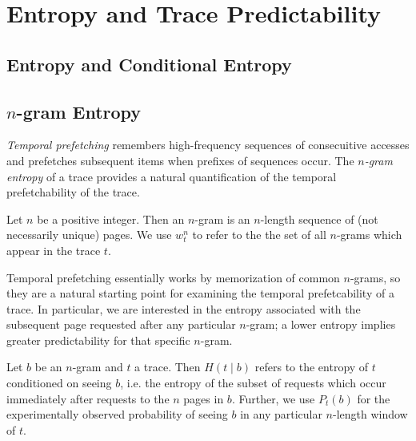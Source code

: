 \section{Entropy and Trace Predictability}

\subsection{Entropy and Conditional Entropy}


\subsection{$n$-gram Entropy}

\textit{Temporal prefetching} remembers high-frequency sequences of
consecuitive accesses and prefetches subsequent items when prefixes of
sequences occur. The \textit{$n$-gram entropy} of a trace provides a natural
quantification of the temporal prefetchability of the trace.


\begin{definition}[$n$-gram] Let $n$ be a positive integer. Then an $n$-gram is
an $n$-length sequence of (not necessarily unique) pages. We use $w_t^n$ to
refer to the the set of all $n$-grams which appear in the trace $t$.
\end{definition}

Temporal prefetching essentially works by memorization of common $n$-grams, so
they are a natural starting point for examining the temporal prefetcability of
a trace. In particular, we are interested in the entropy associated with the
subsequent page requested after any particular $n$-gram; a lower entropy
implies greater predictability for that specific $n$-gram.

\begin{definition} Let $b$ be an $n$-gram and $t$ a trace. Then $H(t \mid b)$
  refers to the entropy of $t$ conditioned on seeing $b$, i.e. the entropy of
  the subset of requests which occur immediately after requests to the $n$
  pages in $b$. Further, we use $P_t(b)$ for the experimentally observed
probability of seeing $b$ in any particular $n$-length window of $t$.
\end{definition}




